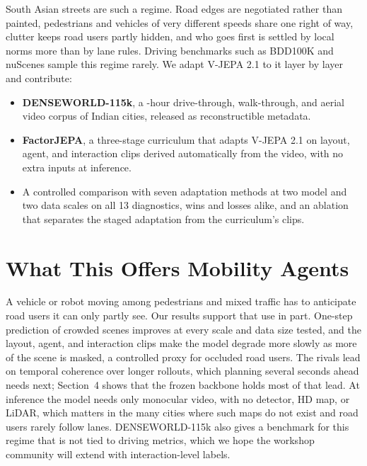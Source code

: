 \documentclass[letterpaper]{article} %
\begin{document}
South Asian streets are such a regime. Road edges are negotiated rather than painted, pedestrians and vehicles of very different speeds share one right of way, clutter keeps road users partly hidden, and who goes first is settled by local norms more than by lane rules. Driving benchmarks such as BDD100K \cite{yu2020bdd100k} and nuScenes \cite{caesar2020nuscenes} sample this regime rarely. We adapt V-JEPA 2.1 to it layer by layer and contribute:
\begin{itemize}
    \item \textbf{DENSEWORLD-115k}, a \nHours{}-hour drive-through, walk-through, and aerial video corpus of \nCities{} Indian cities, released as reconstructible metadata.
    \item \textbf{FactorJEPA}, a three-stage curriculum that adapts V-JEPA 2.1 on layout, agent, and interaction clips derived automatically from the video, with no extra inputs at inference.
    \item A controlled comparison with seven adaptation methods at two model and two data scales on all 13 diagnostics, wins and losses alike, and an ablation that separates the staged adaptation from the curriculum's clips.
\end{itemize}









\section{What This Offers Mobility Agents}

A vehicle or robot moving among pedestrians and mixed traffic has to anticipate road users it can only partly see. Our results support that use in part. One-step prediction of crowded scenes improves at every scale and data size tested, and the layout, agent, and interaction clips make the model degrade more slowly as more of the scene is masked, a controlled proxy for occluded road users. The rivals lead on temporal coherence over longer rollouts, which planning several seconds ahead needs next; Section~4 shows that the frozen backbone holds most of that lead. At inference the model needs only monocular video, with no detector, HD map, or LiDAR, which matters in the many cities where such maps do not exist and road users rarely follow lanes. DENSEWORLD-115k also gives a benchmark for this regime that is not tied to driving metrics, which we hope the workshop community will extend with interaction-level labels.



\clearpage  %
{\small

}
\end{document}
